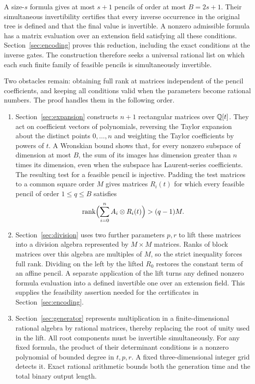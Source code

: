 A size-$s$ formula gives at most $s+1$ pencils of order at most
$B=2s+1$. Their simultaneous invertibility certifies that every
inverse occurrence in the original tree is defined and that the
final value is invertible. A nonzero admissible formula has a
matrix evaluation over an extension field satisfying all these
conditions. Section~\ref{sec:encoding} proves this reduction, including
the exact conditions at the inverse gates. The construction therefore
seeks a universal rational list on which each such finite family of
feasible pencils is simultaneously invertible.

Two obstacles remain: obtaining full rank at matrices independent of
the pencil coefficients, and keeping all conditions valid when the
parameters become rational numbers. The proof handles them in the
following order.
\begin{enumerate}
\item Section~\ref{sec:expansion} constructs $n+1$ rectangular
matrices over $\mathbb Q[t]$. They act on coefficient vectors of polynomials,
reversing the Taylor expansion about the distinct points $0,\ldots,n$
and weighting the Taylor coefficients by powers of $t$.
A Wronskian bound shows that, for every nonzero subspace of dimension
at most $B$, the sum of its images has dimension greater than $n$
times its dimension, even when the subspace has Laurent-series
coefficients. The resulting test for a feasible
pencil is injective. Padding the test matrices to a common square
order $M$ gives matrices $R_i(t)$ for which every feasible pencil of
order $1\leq q\leq B$ satisfies
\[
 \operatorname{rank}\Bigl(\sum_{i=0}^n A_i\otimes R_i(t)\Bigr)>(q-1)M.
\]
\item Section~\ref{sec:division} uses two further parameters $p,r$
to lift these matrices into a division algebra represented by
$M\times M$ matrices. Ranks of block matrices over this algebra are
multiples of $M$, so the strict inequality forces full rank.
Dividing on the left by the lifted $R_0$ restores the constant term
of an affine pencil. A separate application of the lift turns any
defined nonzero formula evaluation into a defined invertible one
over an extension field. This supplies the feasibility assertion
needed for the certificates in Section~\ref{sec:encoding}.
\item Section~\ref{sec:generator} represents multiplication in a
finite-dimensional rational algebra by rational matrices, thereby
replacing the root of unity used in the lift. All root components
must be invertible simultaneously. For any fixed formula, the
product of their determinant conditions is a nonzero polynomial
of bounded degree in $t,p,r$. A fixed three-dimensional integer
grid detects it. Exact rational arithmetic bounds both the
generation time and the total binary output length.
\end{enumerate}

